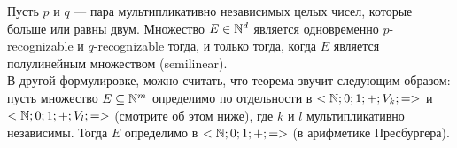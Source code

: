     \begin{Thm}
        Пусть $p$ и $q$ --- пара мультипликативно независимых целых чисел, которые больше или равны двум. Множество $E \in \mathbb{N}^d$ является одновременно $p$-recognizable и $q$-recognizable тогда, и только тогда, когда $E$ является полулинейным множеством (semilinear).\\
        В другой формулировке, можно считать, что теорема звучит следующим образом:\\
        пусть множество $E \subseteq \mathbb{N}^m$ определимо по отдельности в $<\mathbb{N}; 0; 1; +; V_k; =>$ и $<\mathbb{N}; 0; 1; +; V_l; =>$ (смотрите об этом ниже), где $k$ и $l$ мультипликативно независимы. Тогда $E$ определимо в $<\mathbb{N}; 0; 1; +; =>$ (в арифметике Пресбургера).
    \end{Thm}

    
